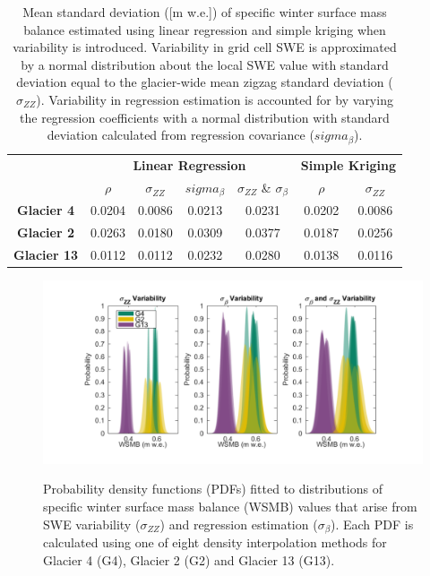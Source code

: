 \documentclass[twocolumn,letterpaper]{igs}
\begin{document}
 \begin{table}[]
\centering
\caption{Mean standard deviation ([m w.e.]) of specific winter surface mass balance estimated using linear regression and simple kriging when variability is introduced. Variability in grid cell SWE is approximated by a normal distribution about the local SWE value with standard deviation equal to the glacier-wide mean zigzag standard deviation ($\sigma_{ZZ}$). Variability in regression estimation is accounted for by varying the regression coefficients with a normal distribution with standard deviation calculated from regression covariance ($sigma_{\beta}$).}
\label{tab:WSMBdistribution_sigma}
\begin{tabular}{ccccccc}
 & \multicolumn{4}{c}{\textbf{Linear Regression}} & \multicolumn{2}{c}{\textbf{Simple Kriging}} \\
 & $\rho$ & $\sigma_{ZZ}$ & $sigma_{\beta}$ & $\sigma_{ZZ}$ \& $\sigma_{\beta}$ & $\rho$ & $\sigma_{ZZ}$ \\
\textbf{Glacier 4} & 0.0204 & 0.0086 & 0.0213 & 0.0231 & 0.0202 & 0.0086 \\
\textbf{Glacier 2} & 0.0263 & 0.0180 & 0.0309 & 0.0377 & 0.0187 & 0.0256 \\
\textbf{Glacier 13} & 0.0112 & 0.0112 & 0.0232 & 0.0280 & 0.0138 & 0.0116
\end{tabular}
\end{table}

\begin{figure}
	\centering
	\includegraphics[width =\textwidth]{WSMBDist_LR.pdf}\\
	\caption{Probability density functions (PDFs) fitted to distributions of specific winter surface mass balance (WSMB) values that arise from SWE variability ($\sigma_{ZZ}$) and regression estimation ($\sigma_{\beta}$). Each PDF is calculated using one of eight density interpolation methods for Glacier 4 (G4), Glacier 2 (G2) and Glacier 13 (G13).}
	\label{fig:WSMBDist_LR}
\end{figure}
\end{document}
